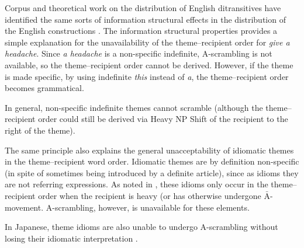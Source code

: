 Corpus and theoretical work on the distribution of English ditransitives have identified the same sorts of information structural effects in the distribution of the English constructions \citep{Collins.1995,Bresnan.2007,Hovav.2008,Bresnan.2009}. The information structural properties provides a simple explanation for the unavailability of the theme--recipient order for \textit{give a headache}. Since \textit{a headache} is a non-specific indefinite, A-scrambling is not available, so the theme--recipient order cannot be derived. However, if the theme is made specific, by using indefinite \textit{this} instead of \textit{a}, the theme--recipient order becomes grammatical.
\begin{exe}
\ex 
\begin{xlist}
\end{xlist}
\end{exe}%
In general, non-specific indefinite themes cannot scramble (although the theme--recipient order could still be derived via Heavy NP Shift of the recipient to the right of the theme).
\begin{exe}
\ex 
\begin{xlist}
\end{xlist}
\end{exe}
The same principle also explains the general unacceptability of idiomatic themes in the theme--recipient word order. Idiomatic themes are by definition non-specific (in spite of sometimes being introduced by a definite article), since as idioms they are not referring expressions. As noted in \cite{Bruening.2010,Bruening.2010b}, these idioms only occur in the theme--recipient order when the recipient is heavy (or has otherwise undergone $\bar{\text{A}}$-movement. A-scrambling, however, is unavailable for these elements.
\begin{exe}
\ex 
\begin{xlist}
\end{xlist}
\end{exe}

In Japanese, theme idioms are also unable to undergo A-scrambling without losing their idiomatic interpretation \citep{Kishimoto.2008}.

